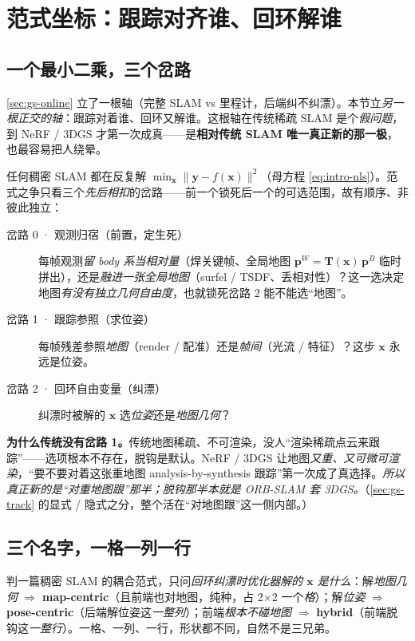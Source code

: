 \section{范式坐标：跟踪对齐谁、回环解谁}
\label{sec:gs-paradigm}

\subsection{一个最小二乘，三个岔路}

\cref{sec:gs-online} 立了一根轴（完整 SLAM vs 里程计，后端纠不纠漂）。本节立\emph{另一根正交的轴}：跟踪对着谁、回环又解谁。这根轴在传统稀疏 SLAM 是个\emph{假问题}，到 NeRF / 3DGS 才第一次成真——是\textbf{相对传统 SLAM 唯一真正新的那一极}，也最容易把人绕晕。

任何稠密 SLAM 都在反复解 $\min_{\mathbf x}\lVert\mathbf y-f(\mathbf x)\rVert^2$（母方程 \cref{eq:intro-nls}）。范式之争只看三个\emph{先后相扣}的岔路——前一个锁死后一个的可选范围，故有顺序、非彼此独立：

\begin{description}
  \item[岔路 0 · 观测归宿（前置，定生死）] 每帧观测\emph{留 body 系当相对量}（焊关键帧、全局地图 $\mathbf p^W=\mathbf T(\mathbf x)\,\mathbf p^B$ 临时拼出），还是\emph{融进一张全局地图}（surfel / TSDF、丢相对性）？这一选决定地图\emph{有没有独立几何自由度}，也就锁死岔路 2 能不能选“地图”。
  \item[岔路 1 · 跟踪参照（求位姿）] 每帧残差参照\emph{地图}（render / 配准）还是\emph{帧间}（光流 / 特征）？这步 $\mathbf x$ 永远是位姿。
  \item[岔路 2 · 回环自由变量（纠漂）] 纠漂时被解的 $\mathbf x$ 选\emph{位姿}还是\emph{地图几何}？
\end{description}

\textbf{为什么传统没有岔路 1。}传统地图稀疏、不可渲染，没人“渲染稀疏点云来跟踪”——选项根本不存在，脱钩是默认。NeRF / 3DGS 让地图\emph{又重、又可微可渲染}，“要不要对着这张重地图 analysis-by-synthesis 跟踪”第一次成了真选择。\emph{所以真正新的是“对重地图跟”那半；脱钩那半本就是 ORB-SLAM 套 3DGS。}（\cref{sec:gs-track} 的显式 / 隐式之分，整个活在“对地图跟”这一侧内部。）

\subsection{三个名字，一格一列一行}

\begin{insight}
判一篇稠密 SLAM 的耦合范式，只问\emph{回环纠漂时优化器解的 $\mathbf x$ 是什么}：解\emph{地图几何} $\Rightarrow$ \textbf{map-centric}（且前端也对地图，纯种，占 2$\times$2 一个\emph{格}）；解\emph{位姿} $\Rightarrow$ \textbf{pose-centric}（后端解位姿这\emph{一整列}）；前端\emph{根本不碰地图} $\Rightarrow$ \textbf{hybrid}（前端脱钩这\emph{一整行}）。一格、一列、一行，形状都不同，自然不是三兄弟。
\end{insight}

